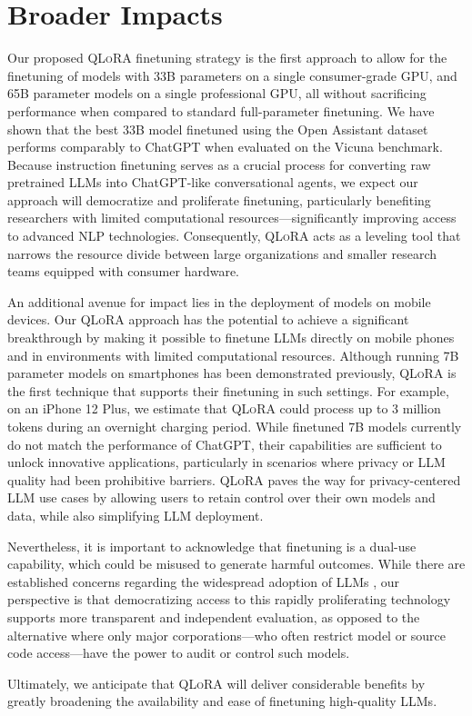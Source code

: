 \section{Broader Impacts}

Our proposed \textsc{QLoRA} finetuning strategy is the first approach to allow for the finetuning of models with 33B parameters on a single consumer-grade GPU, and 65B parameter models on a single professional GPU, all without sacrificing performance when compared to standard full-parameter finetuning. We have shown that the best 33B model finetuned using the Open Assistant dataset performs comparably to ChatGPT when evaluated on the Vicuna benchmark. Because instruction finetuning serves as a crucial process for converting raw pretrained LLMs into ChatGPT-like conversational agents, we expect our approach will democratize and proliferate finetuning, particularly benefiting researchers with limited computational resources—significantly improving access to advanced NLP technologies. Consequently, \textsc{QLoRA} acts as a leveling tool that narrows the resource divide between large organizations and smaller research teams equipped with consumer hardware.

An additional avenue for impact lies in the deployment of models on mobile devices. Our \textsc{QLoRA} approach has the potential to achieve a significant breakthrough by making it possible to finetune LLMs directly on mobile phones and in environments with limited computational resources. Although running 7B parameter models on smartphones has been demonstrated previously, \textsc{QLoRA} is the first technique that supports their finetuning in such settings. For example, on an iPhone 12 Plus, we estimate that \textsc{QLoRA} could process up to 3 million tokens during an overnight charging period. While finetuned 7B models currently do not match the performance of ChatGPT, their capabilities are sufficient to unlock innovative applications, particularly in scenarios where privacy or LLM quality had been prohibitive barriers. \textsc{QLoRA} paves the way for privacy-centered LLM use cases by allowing users to retain control over their own models and data, while also simplifying LLM deployment.

Nevertheless, it is important to acknowledge that finetuning is a dual-use capability, which could be misused to generate harmful outcomes. While there are established concerns regarding the widespread adoption of LLMs \citep{bommasani2021opportunities,bender2021dangers}, our perspective is that democratizing access to this rapidly proliferating technology supports more transparent and independent evaluation, as opposed to the alternative where only major corporations—who often restrict model or source code access—have the power to audit or control such models.

Ultimately, we anticipate that \textsc{QLoRA} will deliver considerable benefits by greatly broadening the availability and ease of finetuning high-quality LLMs.